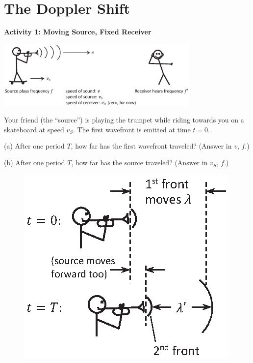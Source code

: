 \section{The Doppler Shift}

\makelabheader %

\vspace{0.1in}
%


\textbf{Activity 1: Moving Source, Fixed Receiver}

\begin{center}
\includegraphics[width=0.75\textwidth]{doppler_shift/moving_source.eps}
\end{center}

Your friend (the ``source'') is playing the trumpet while riding towards you on a skateboard at speed $v_S$.  The first wavefront is emitted at time $t=0$.

(a) After one period $T$, how far has the first wavefront traveled?  (Answer in $v$, $f$.)
\vspace{1.0in}

(b) After one period $T$, how far has the source traveled? (Answer in $v_S$, $f$.)

\begin{figure}
\vspace{-1.5in}
\includegraphics{doppler_shift/front_motion.eps}
\end{figure}

